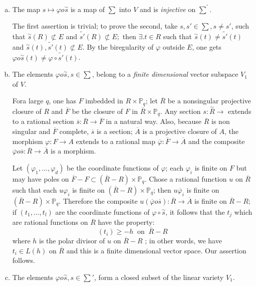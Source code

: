 \begin{enumerate}[a)]
\item The map $s \longmapsto \varphi o \overset{\sim}{s}$ is a map of
  $\sum$ into $V$ and is \textit{ injective } on $\sum^{'}$. 

  The first assertion is trivial; to prove the second, take $s,s' \in
  \sum , s \ne s'$, such that $ \overset{\sim}{s} (R) \not \subset E $
  and $\tilde{s'} (R) \not \subset E;$ then    $\exists . t
  \in R$ such that $\overset{\sim}{s}(t)\ne \tilde{s'}(t)$ and
  $\overset{\sim}{s}(t),\tilde{s'}(t) \not\subset E$. By the
  biregularity  of $\varphi$ outside $E$, one gets $\varphi o
  \overset{\sim}{s} (t) \neq \varphi \circ \tilde{s'} (t)$. 
\item The elements $ \varphi o \overset{\sim}{s}, s \in \sum$, belong
  to a \textit{finite dimensional}  vector subspace $ V_{1}$ of $V$. 

  For\pageoriginale a large $q$, one has $F$ imbedded   in $ R \times \mathbb{P}_q$;
  let  $\overline{R}$ be a nonsingular projective closure of $R$ and
  $\overline{F}$ be the closure of $F$ in $\overline{R} \times
  \mathbb{P}_q$. Any section $s:  \overset{\sim}{R} \longrightarrow$
  extends to a rational section $\overline{s}: \overline{R}
  \longrightarrow \overline{F}$ in a natural way. Also, because
  $\overline{R}$ is non singular and $\overline{F}$ complete,
  $\overline{s}$ is a section; 
  $\overline{A}$ is a projective closure of $A$, the morphism
  $\varphi :F \to A$ extends to a rational map $\overline{\varphi}:
  \overline{F} \to \overline{A}$ and the composite
  $\overline{\varphi} o \overline{s} : \overline{R} \longrightarrow
  \overline{A}$ is a morphism.  

  Let $(\varphi_1, \ldots , \varphi_d)$  be the coordinate functions
  of $\varphi$; each  $\varphi_i$  is finite on $F$  but may have
  poles on $ \overline{F} - F \subset (\overline{R}-R) \times
  \mathbb{P}_q$. Chose a rational function $u$ on $\overline{R}$ such
  that each $ u \varphi_i$ is finite on $(\overline{R}-R) \times
  \mathbb{P}_q$; then $u \overline{\varphi}_i$ is
  finite on $(\overline{R}-R) \times \mathbb{P}_q$. Therefore the
  composite $u(\overline{\varphi} o \overline{s}): \overline{R}
  \longrightarrow \overline{A} $ is finite on $\overline{R}-R$; if
  $(t_1, \ldots , t_l)$ are the coordinate functions of $\varphi \circ
  \overset{\sim}{s}$, it follows that the $t_j$ which are rational
  functions on $\overline{R}$ have the property: 
  $$
  (t_i) \ge - h ~\text { on } ~\overline{R} - R
  $$
  where $h$ is the polar divisor of $u$ on $\overline{R}- R$ ; in
  other words, we have $ t_i \in L(h)$ on $\overline{R}$ and this is a
  finite dimensional vector space. Our assertion follows. 
\item The elements $\varphi o \overset{\sim}{s}, s \in \sum'$, form a
  closed subset of the linear variety $ V_{1}$. 
 

\end{enumerate}
